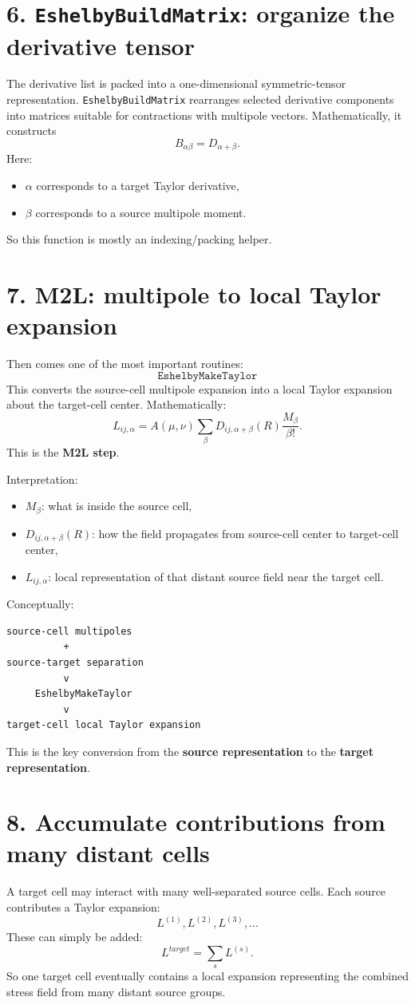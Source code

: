 \documentclass[11pt,a4paper]{article}
\begin{document}
\section*{6. \texttt{EshelbyBuildMatrix}: organize the derivative tensor}
The derivative list is packed into a one-dimensional symmetric-tensor representation.
\texttt{EshelbyBuildMatrix} rearranges selected derivative components into matrices suitable for contractions with multipole vectors.
Mathematically, it constructs
\[\boxed{B_{\alpha\beta}=D_{\alpha+\beta}.}\]
Here:
\begin{itemize}
\item \(\alpha\) corresponds to a target Taylor derivative,
\item \(\beta\) corresponds to a source multipole moment.
\end{itemize}
So this function is mostly an indexing/packing helper.

\section*{7. M2L: multipole to local Taylor expansion}
Then comes one of the most important routines:
\[\boxed{\texttt{EshelbyMakeTaylor}}\]
This converts the source-cell multipole expansion into a local Taylor expansion about the target-cell center.
Mathematically:
\[\boxed{L_{ij,\alpha}=A(\mu,\nu)\sum_\beta D_{ij,\alpha+\beta}(R)\frac{M_\beta}{\beta!}.}\]
This is the \textbf{M2L step}.

Interpretation:
\begin{itemize}
\item \(M_\beta\): what is inside the source cell,
\item \(D_{ij,\alpha+\beta}(R)\): how the field propagates from source-cell center to target-cell center,
\item \(L_{ij,\alpha}\): local representation of that distant source field near the target cell.
\end{itemize}
Conceptually:
\begin{Verbatim}[fontsize=\small]
source-cell multipoles
          +
source-target separation
          v
     EshelbyMakeTaylor
          v
target-cell local Taylor expansion
\end{Verbatim}
This is the key conversion from the \textbf{source representation} to the \textbf{target representation}.

\section*{8. Accumulate contributions from many distant cells}
A target cell may interact with many well-separated source cells.
Each source contributes a Taylor expansion:
\[L^{(1)},L^{(2)},L^{(3)},\ldots\]
These can simply be added:
\[\boxed{L^{target}=\sum_s L^{(s)}.}\]
So one target cell eventually contains a local expansion representing the combined stress field from many distant source groups.
\end{document}
